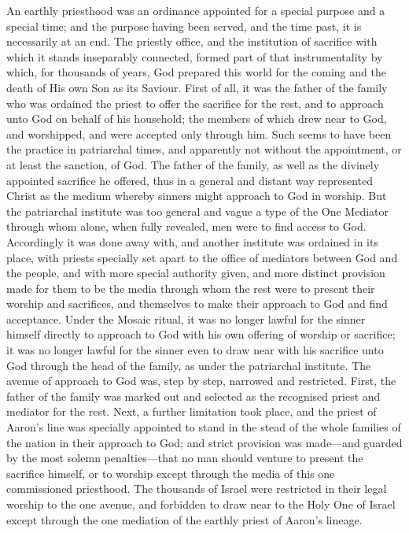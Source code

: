 \documentclass[
]{book}
\begin{document}
An earthly priesthood was an ordinance appointed for a special purpose and a special time; and the purpose having been served, and the time past, it is necessarily at an end. The priestly office, and the institution of sacrifice with which it stands inseparably connected, formed part of that instrumentality by which, for thousands of years, God prepared this world for the coming and the death of His own Son as its Saviour. First of all, it was the father of the family who was ordained the priest to offer the sacrifice for the rest, and to approach unto God on behalf of his household; the members of which drew near to God, and worshipped, and were accepted only through him. Such seems to have been the practice in patriarchal times, and apparently not without the appointment, or at least the sanction, of God. The father of the family, as well as the divinely appointed sacrifice he offered, thus in a general and distant way represented Christ as the medium whereby sinners might approach to God in worship. But the patriarchal institute was too general and vague a type of the One Mediator through whom alone, when fully revealed, men were to find access to God. Accordingly it was done away with, and another institute was ordained in its place, with priests specially set apart to the office of mediators between God and the people, and with more special authority given, and more distinct provision made for them to be the media through whom the rest were to present their worship and sacrifices, and themselves to make their approach to God and find acceptance. Under the Mosaic ritual, it was no longer lawful for the sinner himself directly to approach to God with his own offering of worship or sacrifice; it was no longer lawful for the sinner even to draw near with his sacrifice unto God through the head of the family, as under the patriarchal institute. The avenue of approach to God was, step by step, narrowed and restricted. First, the father of the family was marked out and selected as the recognised priest and mediator for the rest. Next, a further limitation took place, and the priest of Aaron's line was specially appointed to stand in the stead of the whole families of the nation in their approach to God; and strict provision was made---and guarded by the most solemn penalties---that no man should venture to present the sacrifice himself, or to worship except through the media of this one commissioned priesthood. The thousands of Israel were restricted in their legal worship to the one avenue, and forbidden to draw near to the Holy One of Israel except through the one mediation of the earthly priest of Aaron's lineage.
\end{document}
